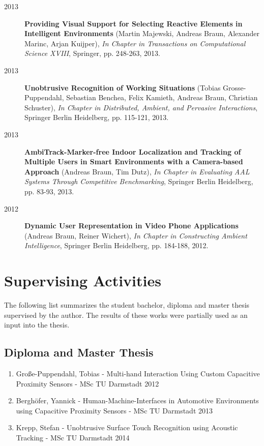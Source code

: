 \begin{appendix}
\begin{description}
\item[2013]{\bf Providing Visual Support for Selecting Reactive Elements in Intelligent Environments} (Martin Majewski, Andreas Braun, Alexander Marinc, Arjan Kuijper), {\em In Chapter in Transactions on Computational Science XVIII}, Springer, pp. 248-263, 2013.
\item[2013]{\bf Unobtrusive Recognition of Working Situations} (Tobias Grosse-Puppendahl, Sebastian Benchea, Felix Kamieth, Andreas Braun, Christian Schuster), {\em In Chapter in Distributed, Ambient, and Pervasive Interactions}, Springer Berlin Heidelberg, pp. 115-121, 2013.
\item[2013]{\bf AmbiTrack-Marker-free Indoor Localization and Tracking of Multiple Users in Smart Environments with a Camera-based Approach} (Andreas Braun, Tim Dutz), {\em In Chapter in Evaluating AAL Systems Through Competitive Benchmarking}, Springer Berlin Heidelberg, pp. 83-93, 2013.
\item[2012]{\bf Dynamic User Representation in Video Phone Applications} (Andreas Braun, Reiner Wichert), {\em In Chapter in Constructing Ambient Intelligence}, Springer Berlin Heidelberg, pp. 184-188, 2012.
\end{description}

\newpage


\chapter{Supervising Activities}

The following list summarizes the student bachelor, diploma and master thesis supervised by the author. The results of these works were partially used as an input into the thesis.

\section{Diploma and Master Thesis}

\begin{enumerate}
\item Große-Puppendahl, Tobias - Multi-hand Interaction Using Custom Capacitive Proximity Sensors - MSc TU Darmstadt 2012 
\item Berghöfer, Yannick - Human-Machine-Interfaces in Automotive Environments using Capacitive Proximity Sensors - MSc TU Darmstadt 2013
\item Krepp, Stefan - Unobtrusive Surface Touch Recognition using Acoustic Tracking - MSc TU Darmstadt 2014
\end{enumerate}


\end{appendix}
